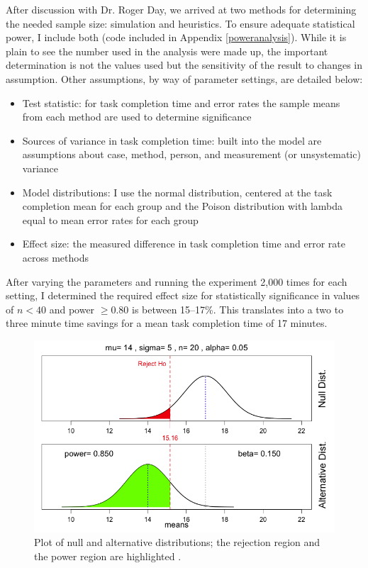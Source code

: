 \documentclass[11pt]{article}
\begin{document}
After discussion with Dr. Roger Day, we arrived at two methods for determining the needed sample size: simulation and heuristics. To ensure adequate statistical power, I include both (code included in Appendix \ref{poweranalysis}). While it is plain to see the number used in the analysis were made up, the important determination is not the values used but the sensitivity of the result to changes in assumption. Other assumptions, by way of parameter settings, are detailed below:

\begin{itemize}
\item{Test statistic: for task completion time and error rates the sample means from each method are used to determine significance}
\item{Sources of variance in task completion time: built into the model are assumptions about case, method, person, and measurement (or unsystematic) variance}
\item{Model distributions: I use the normal distribution, centered at the task completion mean for each group and the Poison distribution with lambda equal to mean error rates for each group}
\item{Effect size: the measured difference in task completion time and error rate across methods}
\end{itemize}

After varying the parameters and running the experiment 2,000 times for each setting, I determined the required effect size for statistically significance in values of $n < 40$ and power $\ge 0.80$ is between 15--17\%. This translates into a two to three minute time savings for a mean task completion time of 17 minutes.

\begin{figure}[h!t]
\begin{center}
\includegraphics[width=\textwidth]{pwranal1.png}
\end{center}
\caption{Plot of null and alternative distributions; the rejection region and the power region are highlighted \cite{Ogle:2012qf}.}\label{pwranal} 
\end{figure}
\end{document}
